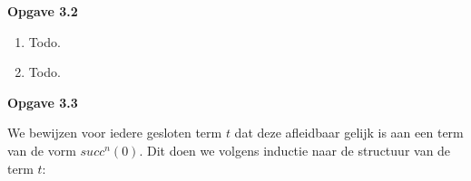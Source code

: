 \documentclass[a4paper,11pt]{article}
\begin{document}
{\bf Opgave 3.2}

\begin{enumerate}

\item %
Todo.

\item %
Todo.\\[2em]

\end{enumerate}


{\bf Opgave 3.3}

We bewijzen voor iedere gesloten term $t$ dat deze afleidbaar gelijk is aan
een term van de vorm $succ^{n}(0)$. Dit doen we volgens inductie naar de
structuur van de term $t$:
\end{document}
